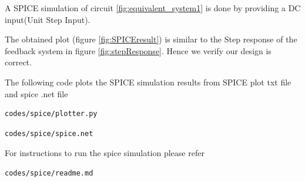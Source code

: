 \begin{enumerate}[label=\thesection.\arabic*.,ref=\thesection.\theenumi]
A SPICE simulation of circuit \ref{fig:equivalent_system1} is done by providing a DC input(Unit Step Input). 

The obtained plot (figure \ref{fig:SPICEresult}) is similar to the Step response of the feedback system in figure \ref{fig:stepResponse}. Hence we verify our design is correct.




The following code plots the SPICE simulation results
from SPICE plot txt file and spice .net file

\begin{lstlisting}
codes/spice/plotter.py
\end{lstlisting}

\begin{lstlisting}
codes/spice/spice.net
\end{lstlisting}

For instructions to run the spice simulation please refer

\begin{lstlisting}
codes/spice/readme.md
\end{lstlisting}
\end{enumerate}